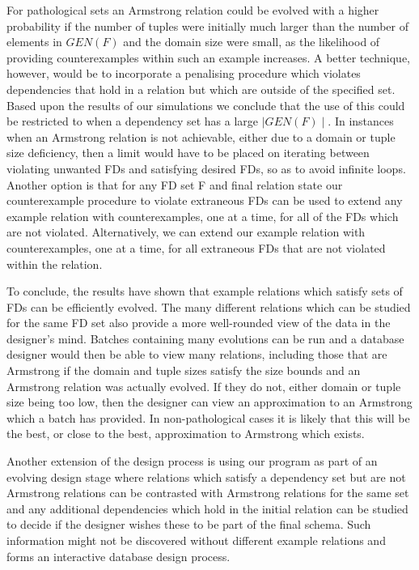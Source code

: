 For pathological sets an Armstrong relation could be evolved with
a higher probability if the number 
of tuples were initially much larger than the number of elements in $GEN(F)$
and the domain size were small, as the likelihood of providing counterexamples
within such an example increases.
A better technique, however, would be to incorporate a penalising
procedure which violates dependencies that hold in a relation but which are
outside of the specified set. Based upon the results of our simulations we
conclude that the use of this could be restricted to when
a dependency set has a large $\mid GEN(F) \mid$. In instances when
an Armstrong relation is not achievable, either due to a domain or
tuple size deficiency, then a limit would have to be placed on iterating
between violating unwanted FDs and satisfying desired FDs, so as to
avoid infinite loops.
Another option is that for any FD set F and final relation state our counterexample
procedure to violate extraneous FDs can be used
to extend any example relation with counterexamples, one at a time, for all of the FDs which are not violated.
Alternatively, we can extend our example relation with counterexamples, one
at a time, for all extraneous FDs that are not violated within the relation.
\medskip

To conclude, the results have shown that example relations which satisfy sets
of FDs can be efficiently evolved. The many different
relations which can be studied for the same FD set also provide a
more well-rounded view of the data in the designer's mind.
Batches containing
many evolutions can be run and a database designer would then be able
to view many relations, including those that are Armstrong if the domain
and tuple sizes satisfy the size bounds and an Armstrong relation
was actually evolved.  If they do not, either domain
or tuple size being too low, then the designer can view an
approximation to an Armstrong which a batch has provided. In
non-pathological cases it is likely that
this will be the best, or close to the best, approximation to Armstrong
which exists.

\smallskip

 Another extension of the 
design process is using our program as part of an evolving design
stage where relations which satisfy a dependency set but are not
Armstrong relations can be contrasted with Armstrong relations for
the same set and any 
additional dependencies which hold in the initial relation can
be studied to decide if the designer wishes these to be part
of the final schema. Such information might not be discovered without
different example relations and forms an interactive database design
process.



